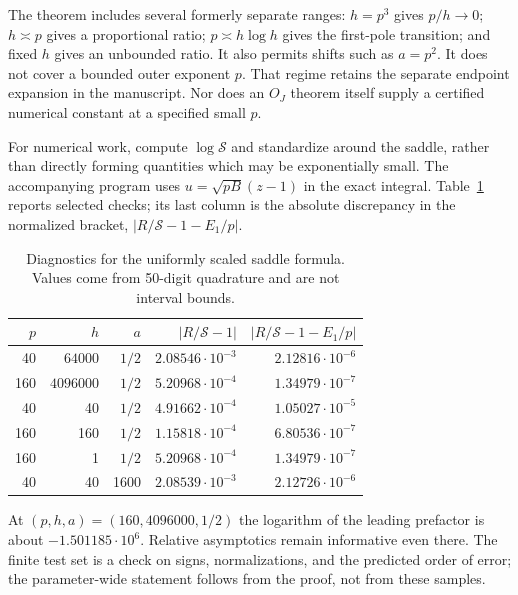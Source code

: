 The theorem includes several formerly separate ranges:
$h=p^3$ gives $p/h\to0$; $h\asymp p$ gives a proportional
ratio; $p\asymp h\log h$ gives the first-pole transition; and fixed
$h$ gives an unbounded ratio. It also permits shifts such as
$a=p^2$. It does not cover a bounded outer exponent $p$. That
regime retains the separate endpoint expansion in the manuscript.
Nor does an $O_J$ theorem itself supply a certified numerical
constant at a specified small $p$.

For numerical work, compute $\log\mathcal S$ and standardize around
the saddle, rather than directly forming quantities which may be
exponentially small. The accompanying program uses
$u=\sqrt{pB}(z-1)$ in the exact integral. Table~\ref{us:tab:saddle}
reports selected checks; its last column is the absolute discrepancy
in the normalized bracket, $|R/\mathcal S-1-E_1/p|$.

\begin{table}[htbp]
\centering
\caption{Diagnostics for the uniformly scaled saddle formula.
Values come from 50-digit quadrature and are not interval bounds.}
\label{us:tab:saddle}
\begin{tabular}{@{}rrrrr@{}}
\toprule
$p$ & $h$ & $a$ & $|R/\mathcal S-1|$ & $|R/\mathcal S-1-E_1/p|$\\
\midrule
40 & $64000$ & $1/2$ & $2.08546\cdot10^{-3}$ & $2.12816\cdot10^{-6}$\\
160 & $4096000$ & $1/2$ & $5.20968\cdot10^{-4}$ & $1.34979\cdot10^{-7}$\\
40 & 40 & $1/2$ & $4.91662\cdot10^{-4}$ & $1.05027\cdot10^{-5}$\\
160 & 160 & $1/2$ & $1.15818\cdot10^{-4}$ & $6.80536\cdot10^{-7}$\\
160 & 1 & $1/2$ & $5.20968\cdot10^{-4}$ & $1.34979\cdot10^{-7}$\\
40 & 40 & 1600 & $2.08539\cdot10^{-3}$ & $2.12726\cdot10^{-6}$\\
\bottomrule
\end{tabular}
\end{table}

At $(p,h,a)=(160,4096000,1/2)$ the logarithm of the leading
prefactor is about $-1.501185\cdot10^6$. Relative asymptotics remain
informative even there. The finite test set is a check on signs,
normalizations, and the predicted order of error; the parameter-wide
statement follows from the proof, not from these samples.
